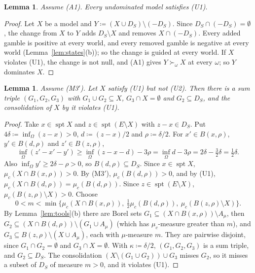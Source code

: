 \documentclass[11pt]{article}
\DeclareMathOperator{\spt}{spt}
\theoremstyle{plain}
\newtheorem{lemma}[theorem]{Lemma}
\theoremstyle{definition}
\theoremstyle{remark}
\begin{document}
\begin{lemma}\label{lem:U1}
Assume (A1). Every undominated model satisfies (U1).
\end{lemma}

\begin{proof}
Let $X$ be a model and $Y\coloneqq(X\cup D_S)\setminus(-D_S)$. Since $D_S\cap(-D_S)=\emptyset$,
the change from $X$ to $Y$ adds $D_S\setminus X$ and removes $X\cap(-D_S)$. Every added gamble
is positive at every world, and every removed gamble is negative at every world
(Lemma~\ref{lem:states}(b)); so the change is guided at every world. If $X$ violates (U1), the
change is not null, and (A1) gives $Y\succ_\omega X$ at every $\omega$; so $Y$ dominates $X$.
\end{proof}

\begin{lemma}\label{lem:U2}
Assume (M3$'$). Let $X$ satisfy (U1) but not (U2). Then there is a sum triple $(G_1,G_2,G_3)$
with $G_1\cup G_2\subseteq X$, $G_3\cap X=\emptyset$ and $G_2\subseteq D_S$, and the
consolidation of $X$ by it violates (U1).
\end{lemma}

\begin{proof}
Take $x\in\spt X$ and $z\in\spt(E\setminus X)$ with $z-x\in D_S$. Put $4\delta\coloneqq
\inf_\Omega(z-x)>0$, $d\coloneqq(z-x)/2$ and $\rho\coloneqq\delta/2$. For $x'\in B(x,\rho)$,
$y'\in B(d,\rho)$ and $z'\in B(z,\rho)$,
\[
  \inf_\Omega(z'-x'-y')\ge\inf_\Omega(z-x-d)-3\rho=\inf_\Omega d-3\rho=2\delta-\tfrac32\delta=
  \tfrac12\delta .
\]
Also $\inf_\Omega y'\ge2\delta-\rho>0$, so $B(d,\rho)\subseteq D_S$. Since $x\in\spt X$,
$\mu_c(X\cap B(x,\rho))>0$. By (M3$'$), $\mu_c(B(d,\rho))>0$, and by (U1),
$\mu_c(X\cap B(d,\rho))=\mu_c(B(d,\rho))$. Since $z\in\spt(E\setminus X)$,
$\mu_c(B(z,\rho)\setminus X)>0$. Choose
\[
  0<m<\min\bigl\{\mu_c(X\cap B(x,\rho)),\ \tfrac12\mu_c(B(d,\rho)),\ \mu_c(B(z,\rho)\setminus
  X)\bigr\}.
\]
By Lemma~\ref{lem:tools}(b) there are Borel sets $G_1\subseteq(X\cap B(x,\rho))\setminus
A_\mu$, then $G_2\subseteq(X\cap B(d,\rho))\setminus(G_1\cup A_\mu)$ (which has
$\mu_c$-measure greater than $m$), and $G_3\subseteq B(z,\rho)\setminus(X\cup A_\mu)$, each
with $\mu$-measure $m$. They are pairwise disjoint, since $G_1\cap G_2=\emptyset$ and $G_3\cap
X=\emptyset$. With $\kappa\coloneqq\delta/2$, $(G_1,G_2,G_3)$ is a sum triple, and $G_2\subseteq
D_S$. The consolidation $(X\setminus(G_1\cup G_2))\cup G_3$ misses $G_2$, so it misses a subset
of $D_S$ of measure $m>0$, and it violates (U1).
\end{proof}
\end{document}
